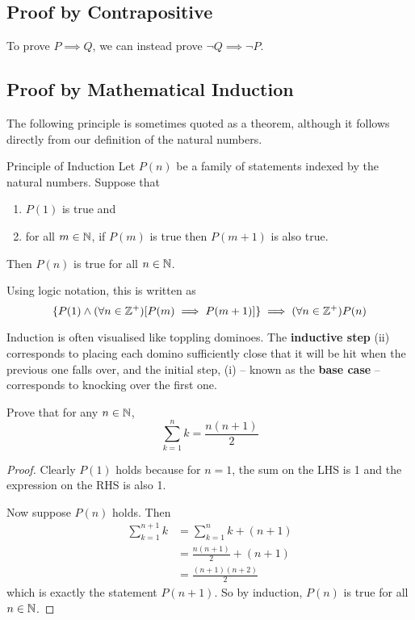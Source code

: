 \subsection{Proof by Contrapositive}
To prove $P \implies Q$, we can instead prove $\lnot Q \implies \lnot P$.

\subsection{Proof by Mathematical Induction}
The following principle is sometimes quoted as a theorem, although it follows directly from our definition of the natural numbers.
\begin{thrm}{Principle of Induction}{}
Let $P(n)$ be a family of statements indexed by the natural numbers. Suppose that 
\begin{enumerate}[label=(\roman*)]
\item $P(1)$ is true and
\item for all $m \in \mathbb N$, if $P(m)$ is true then $P(m+1)$ is also true.
\end{enumerate}
 Then $P(n)$ is true for all $n \in \mathbb N$.
\end{thrm}

Using logic notation, this is written as
\[ \{P(1) \land (\forall n \in \mathbb Z^+) [P(m) \implies P(m+1)]\} \implies (\forall n \in \mathbb Z^+)P(n) \] 

Induction is often visualised like toppling dominoes. The \textbf{inductive step} (ii) corresponds to placing each domino sufficiently close that it will be hit when the previous one falls over, and the initial step, (i) -- known as the \textbf{base case} -- corresponds to knocking over the first one.

\begin{exmp}{}{}
Prove that for any $n \in \mathbb N$,
\[ \sum_{k=1}^n k = \frac{n(n+1)}{2} \]
\end{exmp}

\begin{proof}
Clearly $P(1)$ holds because for $n=1$, the sum on the LHS is 1 and the expression on the RHS is also 1.

Now suppose $P(n)$ holds. Then
\begin{align*}
\sum_{k=1}^{n+1} k &= \sum_{k=1}^n k + (n+1) \\
&= \frac{n(n+1)}{2} + (n+1) \\
&= \frac{(n+1)(n+2)}{2}
\end{align*}
which is exactly the statement $P(n+1)$. So by induction, $P(n)$ is true for all $n \in \mathbb N$.
\end{proof}

